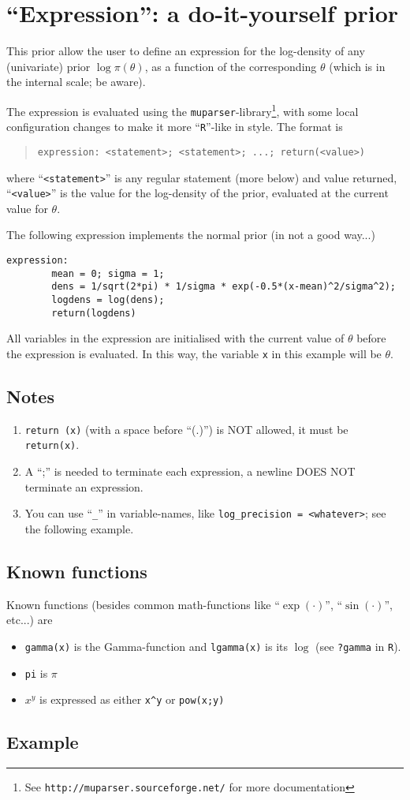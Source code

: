 \documentclass[a4paper,11pt]{article}
\begin{document}
\section*{``Expression'': a do-it-yourself prior}

This prior allow the user to define an expression for the log-density
of any (univariate) prior $\log\pi(\theta)$, as a function of the
corresponding $\theta$ (which is in the internal scale; be aware).

The expression is evaluated using the
\texttt{muparser}-library\footnote{See
    \texttt{http://muparser.sourceforge.net/} for more documentation},
with some local configuration changes to make it more
``\texttt{R}''-like in style. The format is
\begin{quote}
    \texttt{expression: <statement>; <statement>; ...; return(<value>)}
\end{quote}
where ``\texttt{<statement>}'' is any regular statement (more below)
and value returned, ``\texttt{<value>}'' is the value for the
log-density of the prior, evaluated at the current value for $\theta$.

The following expression implements the normal prior (in not a good
way...)
\begin{verbatim}
expression:
        mean = 0; sigma = 1;
        dens = 1/sqrt(2*pi) * 1/sigma * exp(-0.5*(x-mean)^2/sigma^2);
        logdens = log(dens);
        return(logdens)
\end{verbatim}
All variables in the expression are initialised with the current value
of $\theta$ before the expression is evaluated. In this way, the
variable \verb|x| in this example will be $\theta$.

\subsection*{Notes}
\begin{enumerate}
\item \verb|return (x)| (with a space before ``(.)'') is NOT allowed,
    it must be \verb|return(x)|.
\item A ``;'' is needed to terminate each expression, a newline DOES
    NOT terminate an expression.
\item You can use ``\verb|_|'' in variable-names, like
    \verb|log_precision = <whatever>|; see the following example.
\end{enumerate}

\subsection*{Known functions}
Known functions (besides common math-functions like ``$\exp(\cdot)$'',
``$\sin(\cdot)$'', etc...) are
\begin{itemize}
\item \verb|gamma(x)| is the Gamma-function and \verb|lgamma(x)| is
    its $\log$ (see \verb|?gamma| in \verb|R|).
\item \verb|pi| is $\pi$
\item $x^y$ is expressed as either \verb|x^y| or \verb|pow(x;y)|
\end{itemize}

\subsection*{Example}

\end{document}

